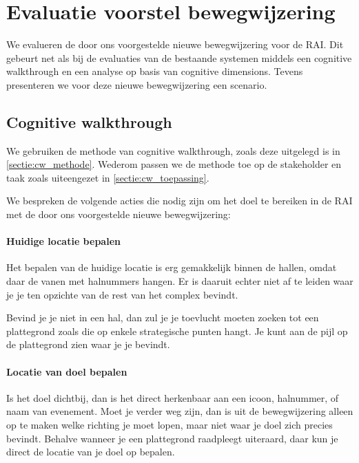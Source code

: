 \chapter{Evaluatie voorstel bewegwijzering}

We evalueren de door ons voorgestelde nieuwe bewegwijzering voor de RAI. Dit gebeurt net als bij de evaluaties van de bestaande systemen middels een cognitive walkthrough en een analyse op basis van cognitive dimensions. Tevens presenteren we voor deze nieuwe bewegwijzering een scenario.


\section{Cognitive walkthrough}

We gebruiken de methode van cognitive walkthrough, zoals deze uitgelegd is in \ref{sectie:cw_methode}. Wederom passen we de methode toe op de stakeholder en taak zoals uiteengezet in \ref{sectie:cw_toepassing}.

We bespreken de volgende acties die nodig zijn om het doel te bereiken in de RAI met de door ons voorgestelde nieuwe bewegwijzering:


\subsubsection{Huidige locatie bepalen}

Het bepalen van de huidige locatie is erg gemakkelijk binnen de hallen, omdat daar de vanen met halnummers hangen. Er is daaruit echter niet af te leiden waar je je ten opzichte van de rest van het complex bevindt.

Bevind je je niet in een hal, dan zul je je toevlucht moeten zoeken tot een plattegrond zoals die op enkele strategische punten hangt. Je kunt aan de pijl op de plattegrond zien waar je je bevindt.


\subsubsection{Locatie van doel bepalen}

Is het doel dichtbij, dan is het direct herkenbaar aan een icoon, halnummer, of naam van evenement. Moet je verder weg zijn, dan is uit de bewegwijzering alleen op te maken welke richting je moet lopen, maar niet waar je doel zich precies bevindt. Behalve wanneer je een plattegrond raadpleegt uiteraard, daar kun je direct de locatie van je doel op bepalen.


